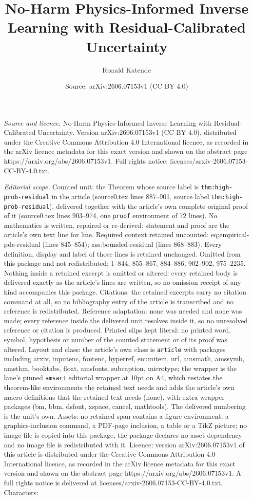 \documentclass[10pt,a4paper]{amsart}
\title[No-Harm Physics-Informed Inverse Learning with Residual-Cali]{No-Harm Physics-Informed Inverse Learning with Residual-Calibrated Uncertainty}
\author{Ronald Katende}
\date{Source: arXiv:2606.07153v1 (CC BY 4.0)}
\begin{document}
\maketitle

\noindent\emph{Source and licence.} No-Harm Physics-Informed Inverse Learning with Residual-Calibrated Uncertainty. Version arXiv:2606.07153v1 (CC BY 4.0), distributed under the Creative Commons Attribution 4.0 International licence, as recorded in the arXiv licence metadata for this exact version and shown on the abstract page https://arxiv.org/abs/2606.07153v1. Full rights notice: licenses/arxiv-2606.07153-CC-BY-4.0.txt.\par\smallskip

\noindent\textit{Editorial scope.} Counted unit: the Theorem whose source label is \texttt{thm:high-prob-residual} in the article (source0.tex lines 887--901, source label \texttt{thm:high-prob-residual}), delivered together with the article's own complete original proof of it (source0.tex lines 903--974, one \texttt{proof} environment of 72 lines). No mathematics is written, repaired or re-derived: statement and proof are the article's own text line for line. Required context retained uncounted: eq:empirical-pde-residual (lines 845--854); ass:bounded-residual (lines 868--883). Every definition, display and label of those lines is retained unchanged. Omitted from this package and not redistributed: 1--844, 855--867, 884--886, 902--902, 975--2235. Nothing inside a retained excerpt is omitted or altered: every retained body is delivered exactly as the article's lines are written, so no omission receipt of any kind accompanies this package. Citations: the retained excerpts carry no citation command at all, so no bibliography entry of the article is transcribed and no reference is redistributed. Reference adaptation: none was needed and none was made; every reference inside the delivered unit resolves inside it, so no unresolved reference or citation is produced. Printed slips kept literal: no printed word, symbol, hypothesis or number of the counted statement or of its proof was altered. Layout and class: the article's own class is \texttt{article} with packages including arxiv, inputenc, fontenc, hyperref, enumitem, url, amsmath, amssymb, amsthm, booktabs, float, amsfonts, subcaption, microtype; the wrapper is the lane's pinned \texttt{amsart} editorial wrapper at 10pt on A4, which restates the theorem-like environments the retained text needs and adds the article's own macro definitions that the retained text needs (none), with extra wrapper packages (bm, bbm, dsfont, xspace, cancel, mathtools). The delivered numbering is the unit's own. Assets: no retained span contains a figure environment, a graphics-inclusion command, a PDF-page inclusion, a table or a TikZ picture; no image file is copied into this package, the package declares no asset dependency and no image file is redistributed with it. Licence: version arXiv:2606.07153v1 of this article is distributed under the Creative Commons Attribution 4.0 International licence, as recorded in the arXiv licence metadata for this exact version and shown on the abstract page https://arxiv.org/abs/2606.07153v1. A full rights notice is delivered at licenses/arxiv-2606.07153-CC-BY-4.0.txt. Characters: 
\end{document}
